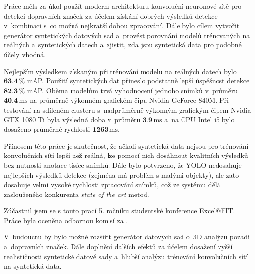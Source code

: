 Práce měla za úkol použít moderní architekturu konvoluční neuronové sítě pro detekci dopravních značek za účelem získání dobrých výsledků detekce v~kombinaci s~co možná nejkratší dobou zpracování. Dále bylo cílem vytvořit generátor syntetických datových sad a~provést porovnání modelů trénovaných na reálných a~syntetických datech a~zjistit, zda jsou syntetická data pro podobné účely vhodná.

Nejlepším výsledkem získaným při trénování modelu na reálných datech bylo $\textbf{63.4}\,\%$ mAP. Použití syntetických dat přineslo podstatně lepší úspěšnost detekce $\textbf{82.3}\,\%$ mAP. Oběma modelům trvá vyhodnocení jednoho snímků v~průměru $\textbf{40.4}\,\mathrm{ms}$ na průměrně výkonném grafickém čipu Nvidia GeForce 840M. Při testování na sdíleném clusteru s~nadprůměrně výkonným grafickým čipem Nvidia GTX 1080 Ti byla výsledná doba v~průměru $\textbf{3.9}\,\mathrm{ms}$ a~na CPU Intel i5 bylo dosaženo průměrné rychlosti $\textbf{1263}\,\mathrm{ms}$.

Přínosem této práce je skutečnost, že ačkoli syntetická data nejsou pro trénování konvolučních sítí lepší než reálná, lze pomocí nich dosáhnout kvalitních výsledků bez nutnosti anotace tisíce snímků. Dále bylo potvrzeno, že YOLO nedosahuje nejlepších výsledků detekce (zejména má problém s malými objekty), ale zato dosahuje velmi vysoké rychlosti zpracování snímků, což ze systému dělá zaslouženého konkurenta \emph{state of the art} metod.

Zúčastnil jsem se s touto prací 5. ročníku studentské konference Excel@FIT. Práce byla oceněna odbornou komisí za .

V~budoucnu by bylo možné rozšířit generátor datových sad o~3D analýzu pozadí a~dopravních značek. Dále doplnění dalších efektů za účelem dosažení vyšší realističnosti syntetické datové sady a~hlubší analýzu trénování konvolučních sítí na syntetická data.